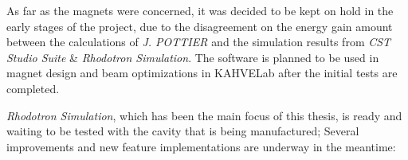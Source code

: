 \documentclass[a4paper,oneside,12pt]{report}
\numberwithin{equation}{chapter}
\begin{document}
As far as the magnets were concerned, it was decided to be kept on hold in the early stages of the project, 
due to the disagreement on the energy gain amount between the calculations of \textit{J. POTTIER} \cite{rhodo_pottier} 
and the simulation results from \textit{CST Studio Suite} \& \textit{Rhodotron Simulation}. 
The software is planned to be used in magnet design and beam optimizations in KAHVELab after the initial tests are completed.

\textit{Rhodotron Simulation}, which has been the main focus of this thesis, is ready and waiting to be tested with the cavity that is being manufactured; 
Several improvements and new feature implementations are underway in the meantime:

\end{document}
